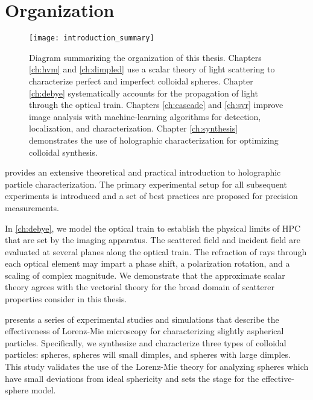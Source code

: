 \section{Organization}

\begin{figure}
  \centering
  \texttt{[image: introduction\_summary]}
  \caption{Diagram summarizing the organization of this thesis.
    Chapters \ref{ch:hvm} and \ref{ch:dimpled} use a scalar
    theory of light scattering to characterize perfect and imperfect
    colloidal spheres. Chapter \ref{ch:debye} systematically
    accounts for the propagation of light through the optical
    train. Chapters \ref{ch:cascade} and \ref{ch:svr} improve
    image analysis with machine-learning algorithms for detection, localization,
    and characterization. Chapter \ref{ch:synthesis} demonstrates the use
    of holographic characterization for optimizing colloidal
    synthesis.}
  \label{fig:intro}
\end{figure}

 provides an extensive theoretical and practical
introduction to holographic particle characterization. The primary
experimental setup for all subsequent experiments is introduced and
a set of best practices are proposed for precision measurements. 

In \autoref{ch:debye}, we model the optical train to establish the
physical limits of HPC that are set by the imaging apparatus. The scattered
field and incident field are evaluated at several planes along the
optical train. The refraction of rays through each optical element
may impart a phase shift, a polarization rotation, and a scaling
of complex magnitude. We demonstrate that the approximate scalar theory
agrees with the vectorial theory for the broad domain of
scatterer properties consider in this thesis.

 presents a series of experimental studies and
simulations that describe the effectiveness of Lorenz-Mie
microscopy for characterizing slightly aspherical particles.
Specifically, we synthesize and characterize three types of colloidal
particles: spheres, spheres will small dimples, and spheres with large dimples.
This study validates the use of the Lorenz-Mie theory
for analyzing spheres which have small deviations from
ideal sphericity and sets the stage for the effective-sphere model.

